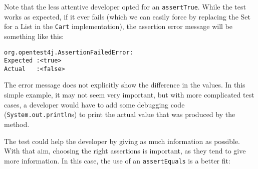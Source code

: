 \begin{Shaded}
\begin{Highlighting}[]
 
      \NormalTok{();}

     \NormalTok{() \{}
\NormalTok{(}\NormalTok{);}
\NormalTok{(}\NormalTok{);}

        \NormalTok{() == }\NormalTok{);}
\NormalTok{    \}}

     \NormalTok{() \{}
\NormalTok{(}\NormalTok{);}
\NormalTok{(}\NormalTok{);}
\NormalTok{(}\NormalTok{);}

        \NormalTok{() == }\NormalTok{);}
\NormalTok{    \}}
\NormalTok{\}}
\end{Highlighting}
\end{Shaded}

Note that the less attentive developer opted for an \texttt{assertTrue}.
While the test works as expected, if it ever fails (which we can easily
force by replacing the Set for a List in the \texttt{Cart}
implementation), the assertion error message will be something like
this:

\begin{verbatim}
org.opentest4j.AssertionFailedError: 
Expected :<true> 
Actual   :<false>
\end{verbatim}

The error message does not explicitly show the difference in the values.
In this simple example, it may not seem very important, but with more
complicated test cases, a developer would have to add some debugging
code (\texttt{System.out.println}s) to print the actual value that was
produced by the method.

The test could help the developer by giving as much information as
possible. With that aim, choosing the right assertions is important, as
they tend to give more information. In this case, the use of an
\texttt{assertEquals} is a better fit:

